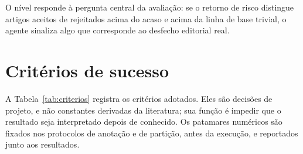 O nível responde à pergunta central da avaliação: se o retorno de risco distingue artigos aceitos de rejeitados acima do acaso e acima da linha de base trivial, o agente sinaliza algo que corresponde ao desfecho editorial real.






\section{Critérios de sucesso}
\label{sec:criterios}

A Tabela~\ref{tab:criterios} registra os critérios adotados. Eles são decisões de projeto, e não constantes derivadas da literatura; sua função é impedir que o resultado seja interpretado depois de conhecido. Os patamares numéricos são fixados nos protocolos de anotação e de partição, antes da execução, e reportados junto aos resultados.

